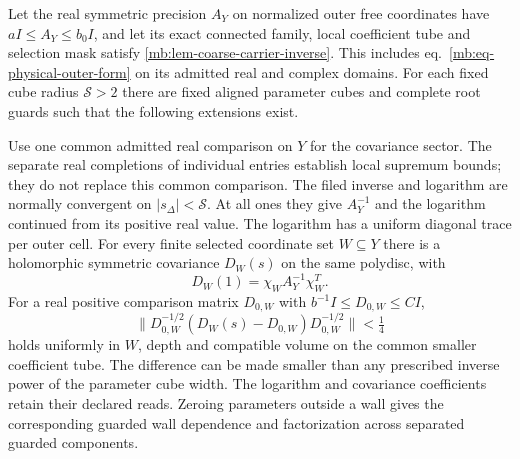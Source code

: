 \documentclass[11pt,letterpaper,reqno]{amsart}
\makeatletter
\numberwithin{equation}{section}
\renewcommand{\eqref}[1]{\textup{eq.~\ref{#1}}}
\theoremstyle{definition}
\newcommand{\ms@majorstart}{%
  \pushQED{\qed}\renewcommand{\qedsymbol}{$\blacksquare\square$}}
\newenvironment{theorem}[1][]{\ms@majorstart\ms@theorem[#1]}
  {\popQED\endms@theorem}
\theoremstyle{remark}
\makeatother
\begin{document}
\begin{theorem}[Filed covariance and logarithm]
\label{mb:thm-filed-covariance}
Let the real symmetric precision \(A_Y\) on normalized outer free coordinates have \(aI\le A_Y\le b_0I\), and let its exact connected family, local coefficient tube and selection mask satisfy \cref{mb:lem-coarse-carrier-inverse}. This includes \eqref{mb:eq-physical-outer-form} on its admitted real and complex domains. For each fixed cube radius \(\mathcal S>2\) there are fixed aligned parameter cubes and complete root guards such that the following extensions exist.

Use one common admitted real comparison on $Y$ for the covariance sector. The separate real completions of individual entries establish local supremum bounds; they do not replace this common comparison. The filed inverse and logarithm are normally convergent on \(|s_\Delta|<\mathcal S\). At all ones they give \(A_Y^{-1}\) and the logarithm continued from its positive real value. The logarithm has a uniform diagonal trace per outer cell. For every finite selected coordinate set \(W\subseteq Y\) there is a holomorphic symmetric covariance \(D_W(s)\) on the same polydisc, with
\begin{equation}\label{mb:eq-selected-covariance}
             D_W(1)=\chi_W A_Y^{-1}\chi_W^T .
\end{equation}
For a real positive comparison matrix \(D_{0,W}\) with \(b^{-1}I\le D_{0,W}\le CI\),
\begin{equation}\label{mb:eq-gaussian-relative-sector}
 \big\|D_{0,W}^{-1/2}(D_W(s)-D_{0,W})D_{0,W}^{-1/2}\big\|<\tfrac14
\end{equation}
holds uniformly in \(W\), depth and compatible volume on the common smaller coefficient tube. The difference can be made smaller than any prescribed inverse power of the parameter cube width. The logarithm and covariance coefficients retain their declared reads. Zeroing parameters outside a wall gives the corresponding guarded wall dependence and factorization across separated guarded components.
\end{theorem}
\end{document}
